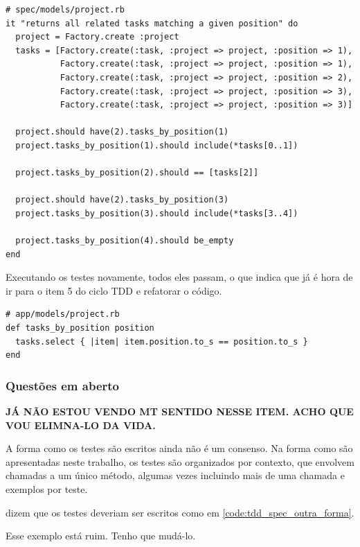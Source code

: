 \begin{lstlisting}[caption=Teste do método Project\#tasks\_by\_position (versão 3),label=code:tdd_spec3]
# spec/models/project.rb
it "returns all related tasks matching a given position" do
  project = Factory.create :project
  tasks = [Factory.create(:task, :project => project, :position => 1),
           Factory.create(:task, :project => project, :position => 1),
           Factory.create(:task, :project => project, :position => 2),
           Factory.create(:task, :project => project, :position => 3),
           Factory.create(:task, :project => project, :position => 3)]

  project.should have(2).tasks_by_position(1)
  project.tasks_by_position(1).should include(*tasks[0..1])

  project.tasks_by_position(2).should == [tasks[2]]

  project.should have(2).tasks_by_position(3)
  project.tasks_by_position(3).should include(*tasks[3..4])

  project.tasks_by_position(4).should be_empty
end
\end{lstlisting}

Executando os testes novamente, todos eles passam, o que indica que já é hora de ir para o item 5 do ciclo TDD e refatorar o código.

\begin{lstlisting}[caption=Código do método Project\#tasks\_by\_position (versão 3),label=code:tdd_code3]
# app/models/project.rb
def tasks_by_position position
  tasks.select { |item| item.position.to_s == position.to_s }
end
\end{lstlisting}

\subsubsection{Questões em aberto}
\label{ssub:tdd_em_averto}

\textbf{JÁ NÃO ESTOU VENDO MT SENTIDO NESSE ITEM. ACHO QUE VOU ELIMNA-LO DA VIDA.}

A forma como os testes são escritos ainda não é um consenso. Na forma como são apresentadas neste trabalho, os testes são organizados por contexto, que envolvem chamadas a um único método, algumas vezes incluindo mais de uma chamada e exemplos por teste.

 dizem que os testes deveriam ser escritos como em \ref{code:tdd_spec_outra_forma}.

Esse exemplo está ruim. Tenho que mudá-lo.

